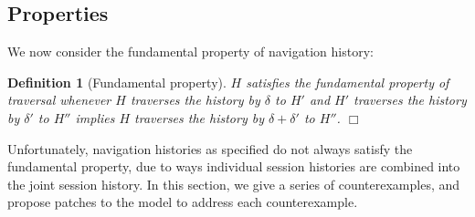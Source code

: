 \documentclass{notes}
\newtheorem{definition}{Definition}
\newcommand{\QED}{\hfill$\Box$}
\begin{document}
\subsection{Properties}
\label{sec:properties}

We now consider the fundamental property of navigation history:

\begin{definition}[Fundamental property]
\label{defn:fundamental}
  $H$ satisfies the \emph{fundamental property of traversal} whenever
  $H$ traverses the history by $\delta$ to $H'$
  and $H'$ traverses the history by $\delta'$ to $H''$
  implies $H$ traverses the history by $\delta+\delta'$ to $H''$.
  \QED
\end{definition}
Unfortunately, navigation histories as specified do not always satisfy the fundamental property,
due to ways individual session histories are combined into the joint session history.
In this section, we give a series of counterexamples, and propose patches to
the model to address each counterexample.
\end{document}

